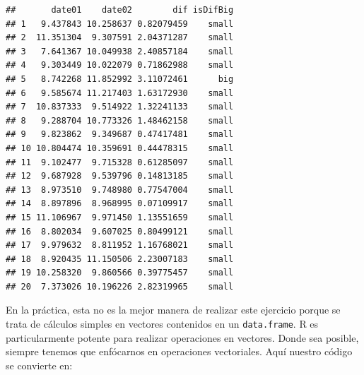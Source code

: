\documentclass[
]{book}
\newenvironment{Shaded}{\begin{snugshade}}{\end{snugshade}}
\newcommand{\ControlFlowTok}[1]{\textcolor[rgb]{0.13,0.29,0.53}{\textbf{#1}}}
\newcommand{\DataTypeTok}[1]{\textcolor[rgb]{0.13,0.29,0.53}{#1}}
\newcommand{\DecValTok}[1]{\textcolor[rgb]{0.00,0.00,0.81}{#1}}
\newcommand{\KeywordTok}[1]{\textcolor[rgb]{0.13,0.29,0.53}{\textbf{#1}}}
\newcommand{\NormalTok}[1]{#1}
\newcommand{\OperatorTok}[1]{\textcolor[rgb]{0.81,0.36,0.00}{\textbf{#1}}}
\newcommand{\OtherTok}[1]{\textcolor[rgb]{0.56,0.35,0.01}{#1}}
\newcommand{\StringTok}[1]{\textcolor[rgb]{0.31,0.60,0.02}{#1}}
\begin{document}
\begin{Shaded}
\end{Shaded}

\begin{verbatim}
##       date01    date02        dif isDifBig
## 1   9.437843 10.258637 0.82079459    small
## 2  11.351304  9.307591 2.04371287    small
## 3   7.641367 10.049938 2.40857184    small
## 4   9.303449 10.022079 0.71862988    small
## 5   8.742268 11.852992 3.11072461      big
## 6   9.585674 11.217403 1.63172930    small
## 7  10.837333  9.514922 1.32241133    small
## 8   9.288704 10.773326 1.48462158    small
## 9   9.823862  9.349687 0.47417481    small
## 10 10.804474 10.359691 0.44478315    small
## 11  9.102477  9.715328 0.61285097    small
## 12  9.687928  9.539796 0.14813185    small
## 13  8.973510  9.748980 0.77547004    small
## 14  8.897896  8.968995 0.07109917    small
## 15 11.106967  9.971450 1.13551659    small
## 16  8.802034  9.607025 0.80499121    small
## 17  9.979632  8.811952 1.16768021    small
## 18  8.920435 11.150506 2.23007183    small
## 19 10.258320  9.860566 0.39775457    small
## 20  7.373026 10.196226 2.82319965    small
\end{verbatim}

En la práctica, esta no es la mejor manera de realizar este ejercicio porque se trata de cálculos simples en vectores contenidos en un \texttt{data.frame}. R es particularmente potente para realizar operaciones en vectores. Donde sea posible, siempre tenemos que enfócarnos en operaciones vectoriales. Aquí nuestro código se convierte en:
\end{document}
